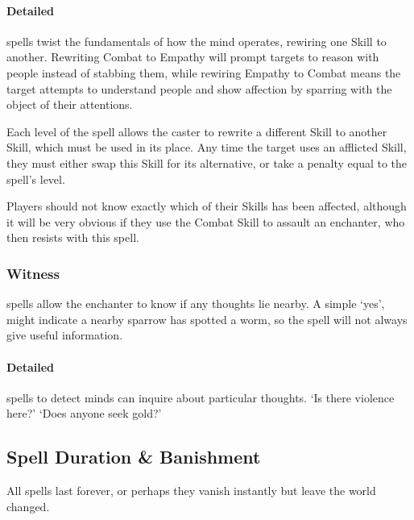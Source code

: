 \begin{multicols}{2}
\paragraph{Detailed}
spells twist the fundamentals of how the mind operates, rewiring one Skill to another.
Rewriting Combat to Empathy will prompt targets to reason with people instead of stabbing them, while rewiring Empathy to Combat means the target attempts to understand people and show affection by sparring with the object of their attentions.

Each level of the spell allows the caster to rewrite a different Skill to another Skill, which must be used in its place.
Any time the target uses an afflicted Skill, they must either swap this Skill for its alternative, or take a penalty equal to the spell's level.

Players should not know exactly which of their Skills has been affected, although it will be very obvious if they use the Combat Skill to assault an enchanter, who then resists with this spell.
\subsubsection{Witness}
spells allow the enchanter to know if any thoughts lie nearby.
A simple `yes', might indicate a nearby sparrow has spotted a worm, so the spell will not always give useful information.

\paragraph{Detailed}
spells to detect minds can inquire about particular thoughts.
`Is there violence here?'
`Does anyone seek gold?'

\subsection{Spell Duration \& Banishment}

All spells last forever, or perhaps they vanish instantly but leave the world changed.


\end{multicols}
